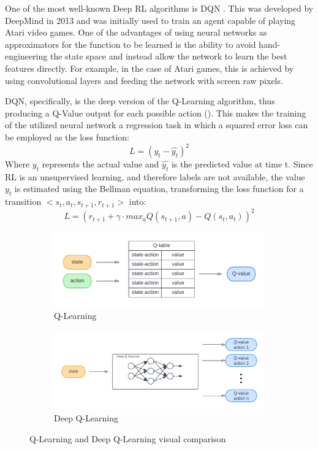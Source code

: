 \documentclass[12pt,a4paper,openright,twoside]{book}
\begin{document}
One of the most well-known Deep RL algorithms is DQN \cite{dqn}. This was developed by DeepMind in 2013 and was initially
    used to train an agent capable of playing Atari video games. One of the advantages of using neural networks as 
    approximators for the function to be learned is the ability to avoid hand-engineering the state space and instead 
    allow the network to learn the best features directly. For example, in the case of Atari games, this is achieved 
    by using convolutional layers and feeding the network with screen raw pixels.
    
DQN, specifically, is the deep version of the Q-Learning algorithm, thus producing a Q-Value output for each 
    possible action (). This makes the training of the utilized neural network a regression task 
    in which a squared error loss can be employed as the loss function:
    $$ L = (y_t - \hat{y_t})^2 $$
    Where $y_t$ represents the actual value and $\hat{y_t}$ is the predicted value at time t. Since RL is an 
    unsupervised learning, and therefore labels are not available, the value $y_t$ is estimated using the 
    Bellman equation, transforming the loss function for a transition $<s_t, a_t, s_{t+1}, r_{t+1}>$ into:
    $$ L = ( r_{t+1} + \gamma \cdot max_a Q(s_{t+1}, a) - Q(s_t, a_t))^2 $$

\begin{figure}[t]
    \begin{subfigure}[b]{0.49\textwidth}
        \centering
        \includegraphics[width=\textwidth]{figures/q-learning.pdf}
        \caption{Q-Learning}
        \label{fig:ql}
    \end{subfigure}
    \begin{subfigure}[b]{0.49\textwidth}
        \centering
        \includegraphics[width=\textwidth]{figures/deepQL.pdf}
        \caption{Deep Q-Learning}
        \label{fig:dqn}
    \end{subfigure}
\caption{Q-Learning and Deep Q-Learning visual comparison}\vspace{-10pt}
\label{fig:qlvsdqn}
\end{figure}
\end{document}
